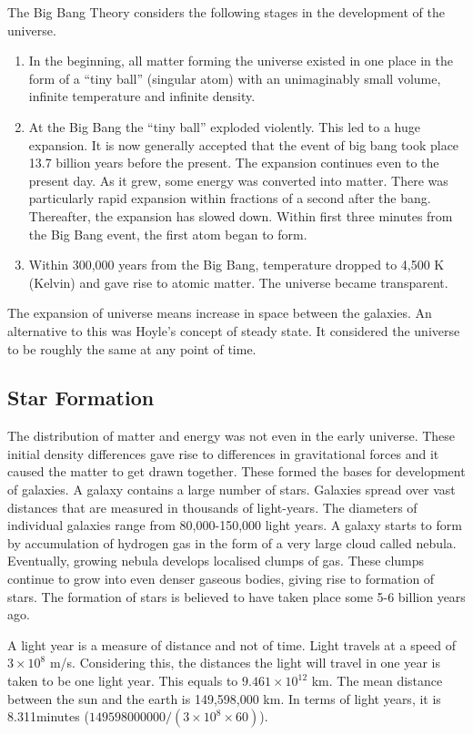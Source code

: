 \documentclass[8pt, a4paper, oneside, twocolumn]{extarticle}
\begin{document}
The Big Bang Theory considers the following stages in the development of the universe.
\begin{enumerate}
  \item In the beginning, all matter forming the universe existed in one place in the form of a “tiny ball” (singular atom) with an unimaginably small volume, infinite temperature and infinite density. 
  \item At the Big Bang the “tiny ball” exploded violently. This led to a huge expansion. It is now generally accepted that the event of big bang took place 13.7 billion years before the present. The expansion continues even to the present day. As it grew, some energy was converted into matter. There was particularly rapid expansion within fractions of a second after the bang. Thereafter, the expansion has slowed down. Within first three minutes from the Big Bang event, the first atom began to form. 
  \item Within 300,000 years from the Big Bang, temperature dropped to 4,500 K (Kelvin) and gave rise to atomic matter. The universe became transparent.
\end{enumerate}

The expansion of universe means increase in space between the galaxies. An alternative to this was Hoyle’s concept of steady state. It considered the universe to be roughly the same at any point of time.

\subsection{Star Formation}

The distribution of matter and energy was not even in the early universe. These initial density differences gave rise to differences in gravitational forces and it caused the matter to get drawn together. These formed the bases for development of galaxies. A galaxy contains a large number of stars. Galaxies spread over vast distances that are measured in thousands of light-years. The diameters of individual galaxies range from 80,000-150,000 light years. A galaxy starts to form by accumulation of hydrogen gas in the form of a very large cloud called nebula. Eventually, growing nebula develops localised clumps of gas. These clumps continue to grow into even denser gaseous bodies, giving rise to formation of stars. The formation of stars is believed to have taken place some 5-6 billion years ago.

\begin{tcolorbox}
A light year is a measure of distance and not of time. Light travels at a speed of $3 \times 10^8$ m/s. Considering this, the distances the light will travel in one year is taken to be one light year. This equals to $9.461 \times 10^{12}$ km. The mean distance between the sun and the earth is 149,598,000 km. In terms of light years, it is 8.311minutes ($149598000000/(3 \times 10^8 \times 60)$).
\end{tcolorbox}
\end{document}
